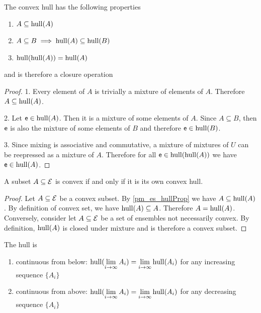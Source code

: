 \begin{coro}\label{pm_es_hullProp}
	The convex hull has the following properties
	\begin{enumerate}
		\item $A \subseteq \mathrm{hull}(A)$
		\item $A \subseteq B \implies \mathrm{hull}(A) \subseteq \mathrm{hull}(B)$
		\item $\mathrm{hull}(\mathrm{hull}(A)) = \mathrm{hull}(A)$
	\end{enumerate}
	and is therefore a closure operation
\end{coro}

\begin{proof}
	1. Every element of $A$ is trivially a mixture of elements of $A$. Therefore $A \subseteq \mathrm{hull}(A)$.
	
	2. Let $\mathsf{e} \in \mathrm{hull}(A)$. Then it is a mixture of some elements of $A$. Since $A \subseteq B$, then $\mathsf{e}$ is also the mixture of some elements of $B$ and therefore $\mathsf{e} \in \mathrm{hull}(B)$.
	
	3. Since mixing is associative and commutative, a mixture of mixtures of $U$ can be reepressed as a mixture of $A$. Therefore for all $\mathsf{e} \in \mathrm{hull}(\mathrm{hull}(A))$ we have $\mathsf{e} \in \mathrm{hull}(A)$.
\end{proof}

\begin{coro}
	A subset $A \subseteq \mathcal{E}$ is convex if and only if it is its own convex hull.
\end{coro}

\begin{proof}
	Let $A \subseteq \mathcal{E}$ be a convex subset. By \ref{pm_es_hullProp} we have $A \subseteq \mathrm{hull}(A)$. By definition of convex set, we have $\mathrm{hull}(A) \subseteq A$. Therefore $A = \mathrm{hull}(A)$. Conversely, consider let $A \subseteq \mathcal{E}$ be a set of ensembles not necessarily convex. By definition, $\mathrm{hull}(A)$ is closed under mixture and is therefore a convex subset.
\end{proof}

\begin{conj}
	The hull is
	\begin{enumerate}
		\item continuous from below: $\mathrm{hull}(\lim\limits_{i \to \infty} A_i) = \lim\limits_{i \to \infty} \mathrm{hull}(A_i)$ for any increasing sequence $\{A_i\}$
		\item continuous from above: $\mathrm{hull}(\lim\limits_{i \to \infty} A_i) = \lim\limits_{i \to \infty} \mathrm{hull}(A_i)$ for any decreasing sequence $\{A_i\}$
	\end{enumerate}
\end{conj}

